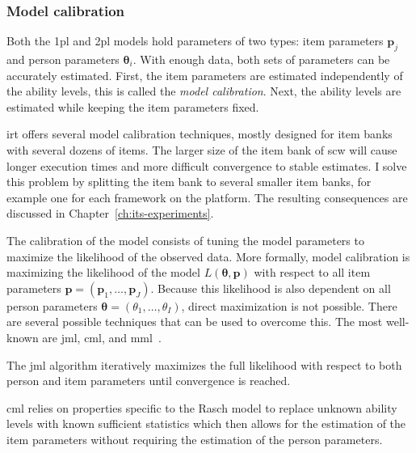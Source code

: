 %
%    

\subsubsection{Model calibration}
Both the \gls{1pl} and \gls{2pl} models hold parameters of two types: item parameters $\bm{p}_j$ and person parameters $\bm{\theta}_i$. 
With enough data, both sets of parameters can be accurately estimated.
First, the item parameters are estimated independently of the ability levels, this is called the \textit{model calibration}. 
Next, the ability levels are estimated while keeping the item parameters fixed.

\Gls{irt} offers several model calibration techniques, mostly designed for item banks with several dozens of items.
The larger size of the item bank of \gls{scw} will cause longer execution times and more difficult convergence to stable estimates.
I solve this problem by splitting the item bank to several smaller item banks, for example one for each framework on the platform.
The resulting consequences are discussed in Chapter~\ref{ch:its-experiments}.

The calibration of the model consists of tuning the model parameters to maximize the likelihood of the observed data.
More formally, model calibration is maximizing the likelihood of the model $L(\bm\theta,\bm{p})$ with respect to all item parameters $\bm{p} = (\bm{p}_1,\dots,\bm{p}_J)$.
Because this likelihood is also dependent on all person parameters $\bm\theta = (\theta_1,\dots,\theta_I)$, direct maximization is not possible.
There are several possible techniques that can be used to overcome this.
The most well-known are \gls{jml}, \gls{cml}, and \gls{mml}~\cite{magis2017computerized}.

The \gls{jml} algorithm iteratively maximizes the full likelihood with respect to both person and item parameters until convergence is reached.

\Gls{cml} relies on properties specific to the Rasch model to replace unknown ability levels with known sufficient statistics which then allows for the estimation of the item parameters without requiring the estimation of the person parameters.

